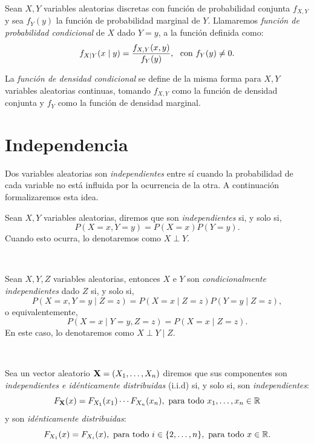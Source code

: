 \documentclass[oneside,openright,titlepage,numbers=noenddot,openany,headinclude,footinclude=true,
cleardoublepage=empty,abstractoff,BCOR=5mm,paper=a4,fontsize=12pt,main=spanish]{scrreprt}
\begin{document}
\begin{definition} \label{def:funcprobcond}
Sean $X,Y$ variables aleatorias discretas con función de probabilidad conjunta $f_{X,Y}$ y sea $f_{Y}(y)$ la función de probabilidad marginal de $Y$. Llamaremos \textit{función de probabilidad condicional} de $X$ dado $Y=y$, a la función definida como: $$f_{X\mid Y}(x \mid y)=\frac{\displaystyle f_{X,Y}(x,y)}{\displaystyle f_Y(y)}, \ \ \text{con} \ f_{Y}(y) \neq 0.$$

\begin{remark}
La \textit{función de densidad condicional} se define de la misma forma para $X,Y$ variables aleatorias continuas, tomando $f_{X,Y}$ como la función de densidad conjunta y $f_{Y}$ como la función de densidad marginal.
\end{remark}
\end{definition}

\section{Independencia}

Dos variables aleatorias son \textit{independientes} entre sí cuando la probabilidad de cada variable no está influida por la ocurrencia de la otra. A continuación formalizaremos esta idea.\\

\begin{definition}
Sean $X,Y$ variables aleatorias, diremos que son \textit{independientes} si, y solo si, $$P(X=x,Y=y)=P(X=x) P(Y=y).$$ Cuando esto ocurra, lo denotaremos como $X \perp Y$.
\end{definition}\

\begin{definition}
Sean $X,Y,Z$ variables aleatorias, entonces $X$ e $Y$ son \textit{condicionalmente independientes} dado $Z$ si, y solo si, $$P(X=x,Y=y \mid Z=z)=P(X=x \mid Z=z) P(Y=y \mid Z=z),$$
o equivalentemente, $$P(X=x \mid Y=y, Z=z)=P(X=x \mid Z=z).$$
En este caso, lo denotaremos como $X \perp Y \mid Z$.
\end{definition}\

\begin{definition}
Sea un vector aleatorio $\textbf{X}=(X_1,\dots,X_n)$ diremos que sus componentes son \textit{independientes e idénticamente distribuidas} (i.i.d) si, y solo si, son \textit{independientes}: $$F_{\nm{X}}(x)=F_{X_1}(x_1)\cdots F_{X_n}(x_n), \ \text{para todo} \ x_1,\dots,x_n \in \R$$
y son \textit{idénticamente distribuidas}: $$F_{X_1}(x)=F_{X_i}(x), \ \text{para todo} \ i \in \{2,\dots,n\}, \ \text{para todo} \ x \in \R.$$
\end{definition}
\end{document}
